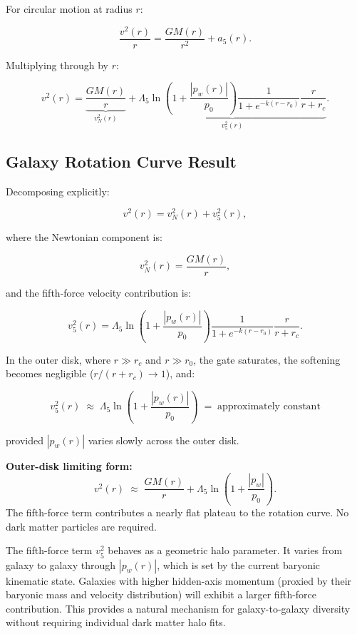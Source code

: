 \documentclass[11pt,a4paper]{article}
\newcommand{\pw}{p_w}                        %
\newcommand{\Lf}{\Lambda_5}                  %
\newcommand{\afiver}{a_5}                    %
\newcommand{\vfive}{v_5}                     %
\newcommand{\vN}{v_N}                        %
\begin{document}
For circular motion at radius $r$:

\[
  \frac{v^2(r)}{r} = \frac{GM(r)}{r^2} + \afiver(r) .
\]

Multiplying through by $r$:

\begin{keybox}
\[
  v^2(r) = \underbrace{\frac{GM(r)}{r}}_{\vN^2(r)}
  + \underbrace{\Lf\ln\!\left(1+\frac{|\pw(r)|}{p_0}\right)
    \frac{1}{1+e^{-k(r-r_0)}}\frac{r}{r+r_c}}_{\vfive^2(r)} .
\]
\end{keybox}

\subsection{Galaxy Rotation Curve Result}\label{sec:galresult}

Decomposing explicitly:

\[
  v^2(r) = \vN^2(r) + \vfive^2(r) ,
\]

where the Newtonian component is:

\[
  \vN^2(r) = \frac{GM(r)}{r} ,
\]

and the fifth-force velocity contribution is:

\[
  \vfive^2(r) = \Lf\ln\!\left(1+\frac{|\pw(r)|}{p_0}\right)
  \frac{1}{1+e^{-k(r-r_0)}} \frac{r}{r+r_c} .
\]

In the outer disk, where $r \gg r_c$ and $r \gg r_0$, the gate saturates,
the softening becomes negligible ($r/(r+r_c) \to 1$), and:

\[
  \vfive^2(r) \;\approx\; \Lf\ln\!\left(1+\frac{|\pw(r)|}{p_0}\right)
  \;=\; \text{approximately constant}
\]

provided $|\pw(r)|$ varies slowly across the outer disk.

\begin{keybox}
\textbf{Outer-disk limiting form:}
\[
  v^2(r) \;\approx\; \frac{GM(r)}{r} + \Lf\ln\!\left(1+\frac{|\pw|}{p_0}\right) .
\]
The fifth-force term contributes a nearly flat plateau to the rotation curve.
No dark matter particles are required.
\end{keybox}

\noindent
The fifth-force term $\vfive^2$ behaves as a geometric halo parameter.
It varies from galaxy to galaxy through $|\pw(r)|$, which is set by the
current baryonic kinematic state.  Galaxies with higher hidden-axis momentum
(proxied by their baryonic mass and velocity distribution) will exhibit a
larger fifth-force contribution.  This provides a natural mechanism for
galaxy-to-galaxy diversity without requiring individual dark matter halo fits.
\end{document}
